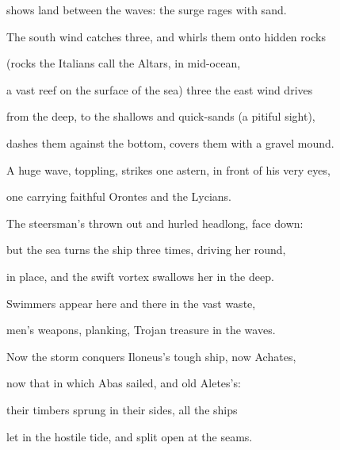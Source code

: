 \documentclass[12pt, a5paper]{minimal}
\begin{document}
shows land between the waves: the surge rages with sand.

The south wind catches three, and whirls them onto hidden rocks

(rocks the Italians call the Altars, in mid-ocean,

a vast reef on the surface of the sea) three the east wind drives

from the deep, to the shallows and quick-sands (a pitiful sight),

dashes them against the bottom, covers them with a gravel mound.

A huge wave, toppling, strikes one astern, in front of his very eyes,

one carrying faithful Orontes and the Lycians.

The steersman’s thrown out and hurled headlong, face down:

but the sea turns the ship three times, driving her round,

in place, and the swift vortex swallows her in the deep.

Swimmers appear here and there in the vast waste,

men’s weapons, planking, Trojan treasure in the waves.

Now the storm conquers Iloneus’s tough ship, now Achates,

now that in which Abas sailed, and old Aletes’s:

their timbers sprung in their sides, all the ships

let in the hostile tide, and split open at the seams.
\end{document}
